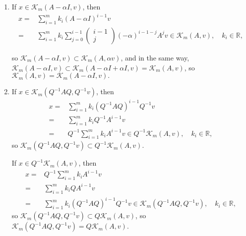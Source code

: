 \documentclass{article}
\begin{document}
\begin{enumerate}[(1)]
    \item  If $x\in \mathcal{K}_m(A-\alpha I,v)$, then
          \begin{equation*}
              \begin{aligned}
                  x= & \sum_{i=1}^m k_i (A-\alpha I)^{i-1}v                                                                                \\
                  =  & \sum_{i=1}^m k_i \sum_{j=0}^{i-1}\begin{pmatrix} i-1 \\
                                                            j\end{pmatrix}(-\alpha)^{i-1-j}A^j v \in\mathcal{K}_m(A,v),\quad k_i\in\mathbb{R},
              \end{aligned}
          \end{equation*}

          so $\mathcal{K}_m(A-\alpha I,v)\subset\mathcal{K}_m( A,\alpha v) $, and in the same way,$\mathcal{K}_m( A-\alpha I, v)\subset\mathcal{K}_m(A-\alpha I +\alpha I, v)= \mathcal{K}_m(A,v)$, so $\mathcal{K}_m(A,v)=\mathcal{K}_m(A-\alpha I,v).$
    \item If $x\in \mathcal{K}_m(Q^{-1}AQ,Q^{-1}v)$, then
          \begin{equation*}
              \begin{aligned}
                  x= & \sum_{i=1}^{m} k_i (Q^{-1}AQ)^{i-1}Q^{-1}v                                                            \\
                  =  & \sum_{i=1}^{m} k_iQ^{-1}A^{i-1}v                                                                      \\
                  =  & Q^{-1}\sum_{i=1}^{m} k_i A^{i-1}v     \in Q^{-1}\mathcal{K}_m(A,v)           ,\quad k_i\in\mathbb{R},
              \end{aligned}
          \end{equation*}
          so $\mathcal{K}_m(Q^{-1}AQ,Q^{-1}v)\subset Q^{-1}\mathcal{K}_m(A,v)$.

          If $x\in Q^{-1}\mathcal{K}_m(A,v)$, then
          \begin{equation*}
              \begin{aligned}
                  x= & Q^{-1}\sum_{i=1}^{m} k_i A^{i-1}v          \\
                  =  & \sum_{i=1}^{m} k_i QA^{i-1}v               \\
                  =  & \sum_{i=1}^{m} k_i (Q^{-1}AQ)^{i-1}Q^{-1}v
                  \in \mathcal{K}_m(Q^{-1}AQ,Q^{-1}v)         ,\quad k_i\in\mathbb{R},
              \end{aligned}
          \end{equation*}
          so $\mathcal{K}_m(Q^{-1}AQ,Q^{-1}v)\subset Q\mathcal{K}_m(A,v)$, so $\mathcal{K}_m(Q^{-1}AQ,Q^{-1}v)= Q\mathcal{K}_m(A,v).$


\end{enumerate}
\end{document}
